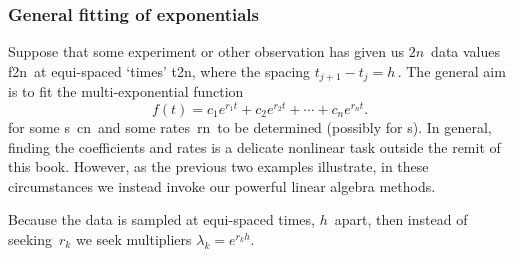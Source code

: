 \subsubsection{General fitting of exponentials}

Suppose that some experiment or other observation has given us \(2n\)~data values \hlist f{2n}\ at equi-spaced `times' \hlist t{2n}, where the spacing \(t_{j+1}-t_j=h\)\,.
The general aim is to fit the multi-exponential function \cite[\S2.6, e.g.]{Cuyt2015}
\begin{equation}
f(t)=c_1e^{r_1t}+c_2e^{r_2t}+\cdots+c_ne^{r_nt}.
\label{eq:eiddse}
\end{equation}
for some s~\hlist cn\ and some rates~\hlist rn\ to be determined (possibly  for s).
In general, finding the coefficients and rates is a delicate nonlinear task outside the remit of this book.
However, as the previous two examples illustrate, in these circumstances we instead invoke our powerful linear algebra methods.

Because the data is sampled at equi-spaced times, \(h\)~apart, then instead of seeking~\(r_k\) we seek multipliers \(\lambda_k=e^{r_kh}\).

